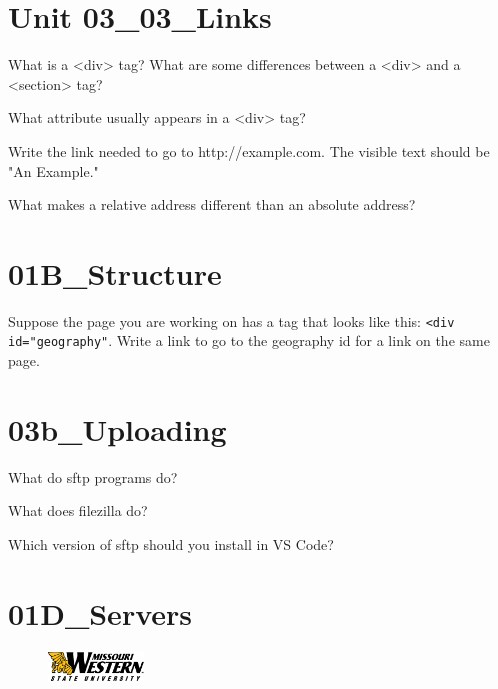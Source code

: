 \documentclass[letterpaper,12pt]{exam}
\begin{document}
\begin{questions}

	\section*{Unit 03\_03\_Links}	

\question What is a <div> tag?  What are some differences between a <div> and a <section> tag?
\vspace{2.5cm}

\question What attribute usually appears in a <div> tag? 
\vspace{1.5cm}

\question Write the link needed to go to http://example.com.  The visible text should be "An Example." 
\vspace{1.5cm}

\question What makes a relative address different than an absolute address? 
\vspace{1.5cm}
\section*{01B\_Structure}

\question Suppose the page you are working on has a tag that looks like this: \texttt{<div id="geography"}.  Write a link to go to the geography id for a link on the same page. 
\vspace{1.cm}

\section*{03b\_Uploading}

\question What do sftp programs do? 
\vspace{1.5cm}

\question What does filezilla do? 
\vspace{1.5cm}

\question Which version of sftp should you install in VS Code? 
\vspace{1.5cm}

\section*{01D\_Servers}
\end{questions}

\begin{figure}[b]\label{end}
	\center
	\includegraphics[width=1in]{tux}
\end{figure}
\end{document}
